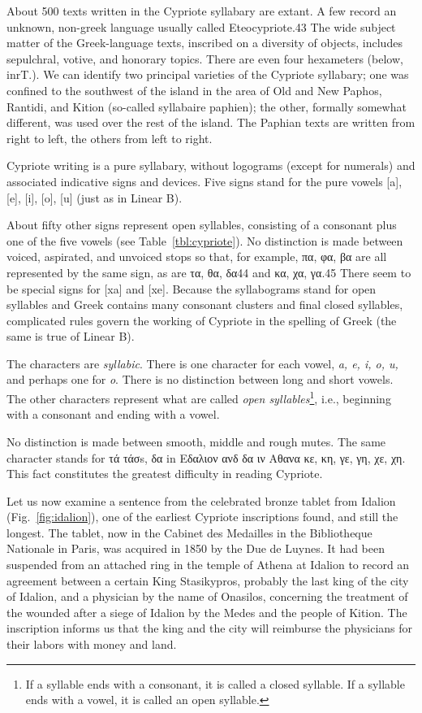 About 500 texts written in the Cypriote syllabary are extant. A few
record an unknown, non-greek language usually called Eteocypriote.43
The wide subject matter of the Greek-language texts, inscribed on a
diversity of objects, includes sepulchral, votive, and honorary topics.
There are even four hexameters (below, inrT.). We can identify two
principal varieties of the Cypriote syllabary; one was confined to the
southwest of the island in the area of Old and New Paphos, Rantidi, and
Kition (so-called syllabaire paphien); the other, formally somewhat
different, was used over the rest of the island. The Paphian texts are
written from right to left, the others from left to right.

Cypriote writing is a pure syllabary, without logograms (except for
numerals) and associated indicative signs and devices. Five signs stand for
the pure vowels [a], [e], [i], [o], [u] (just as in Linear B). 

About fifty other signs represent open syllables, consisting of a consonant plus one of the
five vowels (see Table~\ref{tbl:cypriote}). No distinction is made between voiced, aspirated, and unvoiced stops so that, for example, πα, φα, βα are all represented by the same sign, as are τα, θα, δα44 and κα, χα, γα.45 There
seem to be special signs for [xa] and [xe]. Because the syllabograms stand
for open syllables and Greek contains many consonant clusters and final
closed syllables, complicated rules govern the working of Cypriote in the
spelling of Greek (the same is true of Linear B).

The characters are \textit{syllabic}. There is one character for each  vowel, \textit{a, e, i, o, u,} and perhaps one for \textit{o}. There is no distinction between long and short vowels. The other characters represent what are called \textit{open syllables}\footnote{ If a syllable ends with a consonant, it is called a closed syllable. If a syllable ends with a vowel, it is called an open syllable. }, i.e., beginning with a consonant and ending with a vowel. 

No distinction is made between smooth, middle and rough mutes. The same character stands for τά τ\'ασs, δα in Εδαλιον ανδ δα ιν Αθανα  κε, κη, γε, γη, χε, χη. This fact constitutes the greatest difficulty in reading Cypriote.  

Let us now examine a sentence from the celebrated bronze tablet from
Idalion (Fig.~\ref{fig:idalion}), one of the earliest Cypriote inscriptions found, and still
the longest. The tablet, now in the Cabinet des Medailles in the
Bibliotheque Nationale in Paris, was acquired in 1850 by the Due de
Luynes. It had been suspended from an attached ring in the temple of
Athena at Idalion to record an agreement between a certain King
Stasikypros, probably the last king of the city of Idalion, and a physician
by the name of Onasilos, concerning the treatment of the wounded after
a siege of Idalion by the Medes and the people of Kition. The inscription
informs us that the king and the city will reimburse the physicians for their
labors with money and land. 


